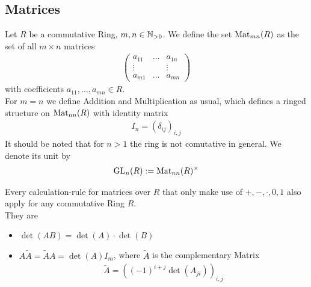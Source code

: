 \subsection{Matrices}
Let $R$ be a commutative Ring, $m,n \in \mathbb{N}_{>0}$. We define the set $\operatorname{Mat}_{mn}(R)$ as the set of all $m \times n$ matrices
\begin{align*}
	\begin{pmatrix}
	a_{11} & \dots  & a_{1n}\\
	\vdots &  & \vdots\\
	a_{m1} & \dots  & a_{mn}
	\end{pmatrix}
\end{align*}
with coefficients $a_{11}, \ldots, a_{mn} \in R$.\\
For $m = n$ we define Addition and Multiplication as usual, which defines a ringed structure on $\operatorname{Mat}_{nn}(R)$ with identity matrix
\begin{align*}
	I_n = (\delta_{ij})_{i,j} 
\end{align*}
It should be noted that for $n > 1$ the ring is not comutative in general. We denote its unit by
\begin{align*}
	\operatorname{GL}_n(R) := \operatorname{Mat}_{nn}(R)^{\times}
\end{align*}

\begin{nproposition}
	Every calculation-rule for matrices over $R$ that only make use of $+,-,\cdot,0,1$ also apply for any commutative Ring $R$.\\
	They are
	\begin{itemize}
		\item $\det(AB) = \det(A) \cdot \det(B)$
		\item $A \tilde{A} = \tilde{A}A = \det(A) I_m$, where $\tilde{A}$ is the complementary Matrix
			\begin{align*}
				\tilde{A} = \left((-1)^{i+j}\det(A_{ji})\right)_{i,j}
			\end{align*}
	\end{itemize}
\end{nproposition}

